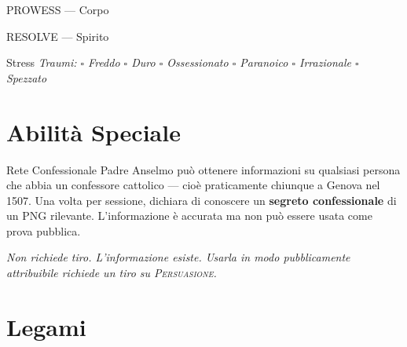 \begin{attributoblock}[SpinolaRed]{PROWESS — Corpo}
\end{attributoblock}


\begin{attributoblock}[SpinolaRed]{RESOLVE — Spirito}
  \end{attributoblock}

\medskip
\begin{pgclockbox}{Stress \hfill {}}
  \small\textit{Traumi: $\square$ Freddo \quad $\square$ Duro \quad $\square$ Ossessionato \quad $\square$ Paranoico \quad $\square$ Irrazionale \quad $\square$ Spezzato}
\end{pgclockbox}

\section*{Abilità Speciale}

\begin{spinolabox}{Rete Confessionale}
  Padre Anselmo può ottenere informazioni su qualsiasi persona che abbia
  un confessore cattolico — cioè praticamente chiunque a Genova nel 1507.
  Una volta per sessione, dichiara di conoscere un \textbf{segreto confessionale}
  di un PNG rilevante. L'informazione è accurata ma non può essere usata
  come prova pubblica.

  \medskip\noindent\textit{Non richiede tiro. L'informazione esiste.
  Usarla in modo pubblicamente attribuibile richiede un tiro su
  \textsc{Persuasione}.}
\end{spinolabox}

\section*{Legami}

